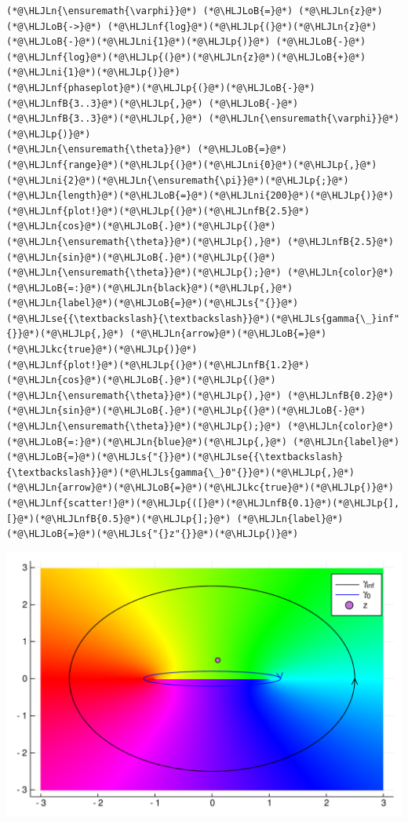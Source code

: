 \documentclass[12pt,a4paper]{article}
\newcommand{\HLJLkc}[1]{\textcolor[RGB]{59,151,46}{\textit{#1}}}
\newcommand{\HLJLn}[1]{#1}
\newcommand{\HLJLnf}[1]{\textcolor[RGB]{66,102,213}{#1}}
\newcommand{\HLJLs}[1]{\textcolor[RGB]{201,61,57}{#1}}
\newcommand{\HLJLse}[1]{\textcolor[RGB]{59,151,46}{#1}}
\newcommand{\HLJLnfB}[1]{\textcolor[RGB]{59,151,46}{#1}}
\newcommand{\HLJLni}[1]{\textcolor[RGB]{59,151,46}{#1}}
\newcommand{\HLJLoB}[1]{\textcolor[RGB]{102,102,102}{\textbf{#1}}}
\newcommand{\HLJLp}[1]{#1}
\begin{document}
\begin{lstlisting}
(*@\HLJLn{\ensuremath{\varphi}}@*) (*@\HLJLoB{=}@*) (*@\HLJLn{z}@*) (*@\HLJLoB{->}@*) (*@\HLJLnf{log}@*)(*@\HLJLp{(}@*)(*@\HLJLn{z}@*)(*@\HLJLoB{-}@*)(*@\HLJLni{1}@*)(*@\HLJLp{)}@*) (*@\HLJLoB{-}@*) (*@\HLJLnf{log}@*)(*@\HLJLp{(}@*)(*@\HLJLn{z}@*)(*@\HLJLoB{+}@*)(*@\HLJLni{1}@*)(*@\HLJLp{)}@*)
(*@\HLJLnf{phaseplot}@*)(*@\HLJLp{(}@*)(*@\HLJLoB{-}@*)(*@\HLJLnfB{3..3}@*)(*@\HLJLp{,}@*) (*@\HLJLoB{-}@*)(*@\HLJLnfB{3..3}@*)(*@\HLJLp{,}@*) (*@\HLJLn{\ensuremath{\varphi}}@*)(*@\HLJLp{)}@*)
(*@\HLJLn{\ensuremath{\theta}}@*) (*@\HLJLoB{=}@*) (*@\HLJLnf{range}@*)(*@\HLJLp{(}@*)(*@\HLJLni{0}@*)(*@\HLJLp{,}@*)(*@\HLJLni{2}@*)(*@\HLJLn{\ensuremath{\pi}}@*)(*@\HLJLp{;}@*) (*@\HLJLn{length}@*)(*@\HLJLoB{=}@*)(*@\HLJLni{200}@*)(*@\HLJLp{)}@*)
(*@\HLJLnf{plot!}@*)(*@\HLJLp{(}@*)(*@\HLJLnfB{2.5}@*)(*@\HLJLn{cos}@*)(*@\HLJLoB{.}@*)(*@\HLJLp{(}@*)(*@\HLJLn{\ensuremath{\theta}}@*)(*@\HLJLp{),}@*) (*@\HLJLnfB{2.5}@*)(*@\HLJLn{sin}@*)(*@\HLJLoB{.}@*)(*@\HLJLp{(}@*)(*@\HLJLn{\ensuremath{\theta}}@*)(*@\HLJLp{);}@*) (*@\HLJLn{color}@*)(*@\HLJLoB{=:}@*)(*@\HLJLn{black}@*)(*@\HLJLp{,}@*) (*@\HLJLn{label}@*)(*@\HLJLoB{=}@*)(*@\HLJLs{"{}}@*)(*@\HLJLse{{\textbackslash}{\textbackslash}}@*)(*@\HLJLs{gamma{\_}inf"{}}@*)(*@\HLJLp{,}@*) (*@\HLJLn{arrow}@*)(*@\HLJLoB{=}@*)(*@\HLJLkc{true}@*)(*@\HLJLp{)}@*)
(*@\HLJLnf{plot!}@*)(*@\HLJLp{(}@*)(*@\HLJLnfB{1.2}@*)(*@\HLJLn{cos}@*)(*@\HLJLoB{.}@*)(*@\HLJLp{(}@*)(*@\HLJLn{\ensuremath{\theta}}@*)(*@\HLJLp{),}@*) (*@\HLJLnfB{0.2}@*)(*@\HLJLn{sin}@*)(*@\HLJLoB{.}@*)(*@\HLJLp{(}@*)(*@\HLJLoB{-}@*)(*@\HLJLn{\ensuremath{\theta}}@*)(*@\HLJLp{);}@*) (*@\HLJLn{color}@*)(*@\HLJLoB{=:}@*)(*@\HLJLn{blue}@*)(*@\HLJLp{,}@*) (*@\HLJLn{label}@*)(*@\HLJLoB{=}@*)(*@\HLJLs{"{}}@*)(*@\HLJLse{{\textbackslash}{\textbackslash}}@*)(*@\HLJLs{gamma{\_}0"{}}@*)(*@\HLJLp{,}@*) (*@\HLJLn{arrow}@*)(*@\HLJLoB{=}@*)(*@\HLJLkc{true}@*)(*@\HLJLp{)}@*)
(*@\HLJLnf{scatter!}@*)(*@\HLJLp{([}@*)(*@\HLJLnfB{0.1}@*)(*@\HLJLp{],[}@*)(*@\HLJLnfB{0.5}@*)(*@\HLJLp{];}@*) (*@\HLJLn{label}@*)(*@\HLJLoB{=}@*)(*@\HLJLs{"{}z"{}}@*)(*@\HLJLp{)}@*)
\end{lstlisting}

\includegraphics[width=\linewidth]{figures/Lecture11_7_1.pdf}
\end{document}
